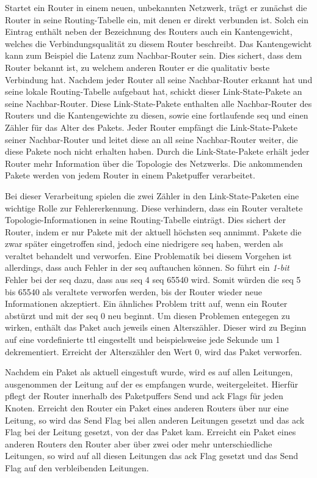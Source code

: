 \documentclass[11pt,a4paper,final]{article}
\begin{document}
Startet ein Router in einem neuen, unbekannten Netzwerk, trägt er zunächst die Router in seine Routing-Tabelle ein, mit denen er direkt verbunden ist.
Solch ein Eintrag enthält neben der Bezeichnung des Routers auch ein Kantengewicht, welches die Verbindungsqualität zu diesem Router beschreibt.
Das Kantengewicht kann zum Beispiel die Latenz zum Nachbar-Router sein.
Dies sichert, dass dem Router bekannt ist, zu welchem anderen Router er die qualitativ beste Verbindung hat. Nachdem jeder Router all seine Nachbar-Router erkannt hat und seine lokale Routing-Tabelle aufgebaut hat, schickt dieser Link-State-Pakete an seine Nachbar-Router.
Diese Link-State-Pakete enthalten alle Nachbar-Router des Routers und die Kantengewichte zu diesen, sowie eine fortlaufende \ac{seq} und einen Zähler für das Alter des Pakets.
Jeder Router empfängt die Link-State-Pakete seiner Nachbar-Router und leitet diese an all seine Nachbar-Router weiter, die diese Pakete noch nicht erhalten haben.
Durch die Link-State-Pakete erhält jeder Router mehr Information über die Topologie des Netzwerks.
Die ankommenden Pakete werden von jedem Router in einem Paketpuffer verarbeitet.

Bei dieser Verarbeitung spielen die zwei Zähler in den Link-State-Paketen eine wichtige Rolle zur Fehlererkennung.
Diese verhindern, dass ein Router veraltete Topologie-Informationen in seine Routing-Tabelle einträgt. Dies sichert der Router, indem er nur Pakete mit der aktuell höchsten \ac{seq} annimmt.
Pakete die zwar später eingetroffen sind, jedoch eine niedrigere \ac{seq} haben, werden als veraltet behandelt und verworfen.
Eine Problematik bei diesem Vorgehen ist allerdings, dass auch Fehler in der \ac{seq} auftauchen können.
So führt ein \textit{1-bit} Fehler bei der \ac{seq} dazu, dass aus \ac{seq} 4 \ac{seq} 65540 wird.
Somit würden die \ac{seq} 5 bis 65540 als veraltete verworfen werden, bis der Router wieder neue Informationen akzeptiert.
Ein ähnliches Problem tritt auf, wenn ein Router abstürzt und mit der \ac{seq} 0 neu beginnt.
Um diesen Problemen entegegen zu wirken, enthält das Paket auch jeweils einen Alterszähler.
Dieser wird zu Beginn auf eine vordefinierte \ac{ttl} eingestellt und beispielsweise jede Sekunde um 1 dekrementiert.
Erreicht der Alterszähler den Wert 0, wird das Paket verworfen. \citep{AndrewS.Tanenbaum2010}

Nachdem ein Paket als aktuell eingestuft wurde, wird es auf allen Leitungen, ausgenommen der Leitung auf der es empfangen wurde, weitergeleitet.
Hierfür pflegt der Router innerhalb des Paketpuffers Send und \ac{ack} Flags für jeden Knoten.
Erreicht den Router ein Paket eines anderen Routers über nur eine Leitung, so wird das Send Flag bei allen anderen Leitungen gesetzt und das \ac{ack} Flag bei der Leitung gesetzt, von der das Paket kam.
Erreicht ein Paket eines anderen Routers den Router aber über zwei oder mehr unterschiedliche Leitungen, so wird auf all diesen Leitungen das \ac{ack} Flag gesetzt und das Send Flag auf den verbleibenden Leitungen. \citep{AndrewS.Tanenbaum2010}
\end{document}
